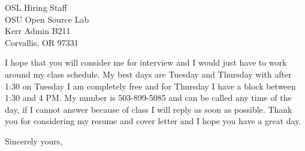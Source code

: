 \documentclass{letter} %
\begin{document}
\begin{letter}{OSL Hiring Staff \\
OSU Open Source Lab \\
Kerr Admin B211\\
Corvallis, OR 97331}
 
\noindent I hope that you will consider me for interview and I would just have to work around my class schedule. My best days are Tuesday and Thursday with after 1:30 on Tuesday I am completely free and for Thursday I have a block between 1:30 and 4 PM. My number is 503-899-5085 and can be called any time of the day, if I cannot answer because of class I will reply as soon as possible. Thank you for considering my resume and cover letter and I hope you have a great day.
 
\closing{Sincerely yours,} 
 

 

\end{letter}
 
\end{document}

